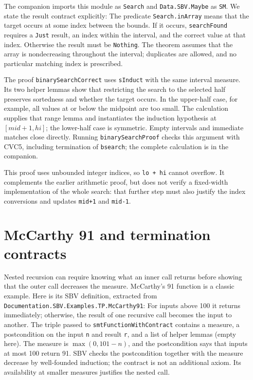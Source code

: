 \documentclass[review]{jfp-epi}
\newcommand{\code}[1]{\texttt{#1}}
\begin{document}
The companion imports this module as \code{Search} and
\code{Data.SBV.Maybe} as \code{SM}. We state the result contract explicitly:
The predicate \code{Search.inArray} means that the target occurs at some index
between the bounds. If it occurs, \code{searchFound} requires a \code{Just}
result, an index within the interval, and the correct value at that index.
Otherwise the result must be \code{Nothing}. The theorem assumes that the array
is nondecreasing throughout the interval; duplicates are allowed, and no
particular matching index is prescribed.

The proof \code{binarySearchCorrect} uses \code{sInduct} with the same interval
measure. Its two helper lemmas show that restricting the search to the selected
half preserves sortedness and whether the target occurs. In the upper-half
case, for example, all values at or below the midpoint are too small. The
calculation supplies that range lemma and instantiates the induction hypothesis
at $[\mathit{mid}+1,\mathit{hi}]$; the lower-half case is symmetric. Empty
intervals and immediate matches close directly. Running
\code{binarySearchProof} checks this argument with CVC5, including termination
of \code{bsearch}; the complete calculation is in the companion.

This proof uses unbounded integer indices, so \code{lo + hi} cannot overflow.
It complements the earlier arithmetic proof, but does not verify a fixed-width
implementation of the whole search: that further step must also justify the
index conversions and updates \code{mid+1} and \code{mid-1}.


\section{McCarthy 91 and termination contracts}
\label{sec:mccarthy91}
Nested recursion can require knowing what an inner call returns before showing
that the outer call decreases the measure. McCarthy's 91 function is a classic
example. Here is its SBV definition, extracted from
\code{Documentation.\allowbreak SBV.\allowbreak Examples.\allowbreak TP.\allowbreak McCarthy91}:
For inputs above 100 it returns immediately; otherwise, the result of one
recursive call becomes the input to another. The triple passed to
\code{smtFunctionWithContract} contains a measure, a postcondition on the input
\code{n} and result \code{r}, and a list of helper lemmas (empty here).
The measure is $\max(0,101-n)$, and the postcondition says that inputs at most
100 return 91. SBV checks the postcondition together with the measure decrease
by well-founded induction; the contract is not an additional axiom. Its
availability at smaller measures justifies the nested call.
\end{document}
